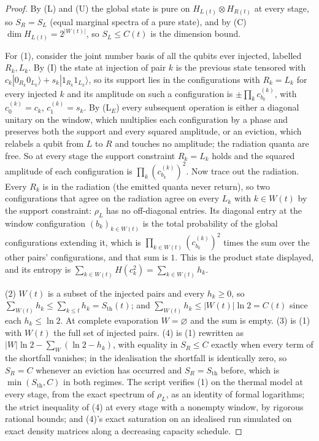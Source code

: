 \documentclass[11pt]{article}
\theoremstyle{definition}
\newcommand{\Sth}{S_{\mathrm{th}}}
\begin{document}
\begin{proof}
By (L) and (U) the global state is pure on $H_{L(t)} \otimes H_{R(t)}$ at every stage, so $S_R = S_L$ (equal marginal spectra of a pure state), and by (C) $\dim H_{L(t)} = 2^{|W(t)|}$, so $S_L \leq C(t)$ is the dimension bound.

For (1), consider the joint number basis of all the qubits ever injected, labelled $R_k, L_k$. By (I) the state at injection of pair $k$ is the previous state tensored with $c_k|0_{R_k}0_{L_k}\rangle + s_k|1_{R_k}1_{L_k}\rangle$, so its support lies in the configurations with $R_k = L_k$ for every injected $k$ and its amplitude on such a configuration is $\pm\prod_k c^{(k)}_{b_k}$, with $c^{(k)}_0 = c_k$, $c^{(k)}_1 = s_k$. By (L$_E$) every subsequent operation is either a diagonal unitary on the window, which multiplies each configuration by a phase and preserves both the support and every squared amplitude, or an eviction, which relabels a qubit from $L$ to $R$ and touches no amplitude; the radiation quanta are free. So at every stage the support constraint $R_k = L_k$ holds and the squared amplitude of each configuration is $\prod_k (c^{(k)}_{b_k})^{2}$. Now trace out the radiation. Every $R_k$ is in the radiation (the emitted quanta never return), so two configurations that agree on the radiation agree on every $L_k$ with $k \in W(t)$ by the support constraint: $\rho_L$ has no off-diagonal entries. Its diagonal entry at the window configuration $(b_k)_{k \in W(t)}$ is the total probability of the global configurations extending it, which is $\prod_{k \in W(t)}(c^{(k)}_{b_k})^{2}$ times the sum over the other pairs' configurations, and that sum is $1$. This is the product state displayed, and its entropy is $\sum_{k \in W(t)} H(c_k^{2}) = \sum_{k \in W(t)} h_k$.

(2) $W(t)$ is a subset of the injected pairs and every $h_k \geq 0$, so $\sum_{W(t)} h_k \leq \sum_{k \leq t} h_k = \Sth(t)$; and $\sum_{W(t)} h_k \leq |W(t)|\ln 2 = C(t)$ since each $h_k \leq \ln 2$. At complete evaporation $W = \varnothing$ and the sum is empty. (3) is (1) with $W(t)$ the full set of injected pairs. (4) is (1) rewritten as $|W|\ln 2 - \sum_{W}(\ln 2 - h_k)$, with equality in $S_R \leq C$ exactly when every term of the shortfall vanishes; in the idealisation the shortfall is identically zero, so $S_R = C$ whenever an eviction has occurred and $S_R = \Sth$ before, which is $\min(\Sth, C)$ in both regimes. The script verifies (1) on the thermal model at every stage, from the exact spectrum of $\rho_L$, as an identity of formal logarithms; the strict inequality of (4) at every stage with a nonempty window, by rigorous rational bounds; and (4)'s exact saturation on an idealised run simulated on exact density matrices along a decreasing capacity schedule.
\end{proof}
\end{document}

